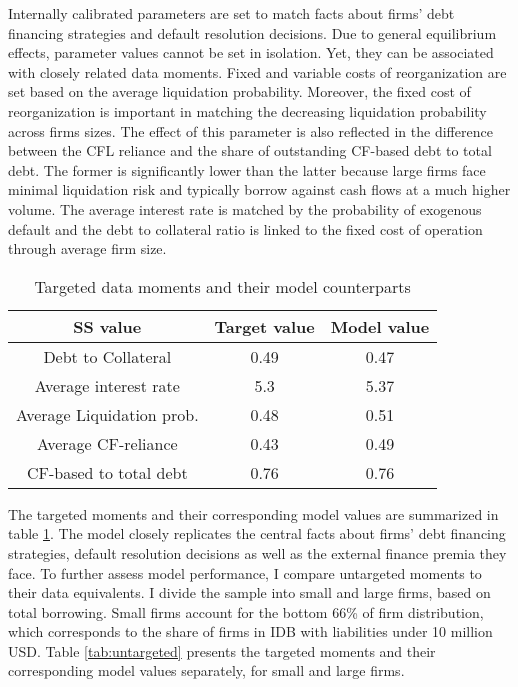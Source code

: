 \documentclass[12pt]{article}
\begin{document}
\noindent Internally calibrated parameters are set to match facts about firms' debt financing strategies and default resolution decisions. Due to general equilibrium effects, parameter values cannot be set in isolation. Yet, they can be associated with closely related data moments. Fixed and variable costs of reorganization are set based on the average liquidation probability. Moreover, the fixed cost of reorganization is important in matching the decreasing liquidation probability across firms sizes. The effect of this parameter is also reflected in the difference between the CFL reliance and the share of outstanding CF-based debt to total debt. The former is significantly lower than the latter because large firms face minimal liquidation risk and typically borrow against cash flows at a much higher volume. The average interest rate is matched by the probability of exogenous default and the debt to collateral ratio is linked to the fixed cost of operation through average firm size. 

\begin{table}[h!]
    \centering
    \begin{tabular}{c|c|c}
    \toprule
    \textbf{SS value} & \textbf{Target value} & \textbf{Model value} \\ 
    \midrule
    Debt to Collateral & 0.49 & 0.47 \\ 
    Average interest rate & 5.3 & 5.37 \\ 
    Average Liquidation prob. & 0.48 & 0.51 \\ 
    Average CF-reliance & 0.43 & 0.49 \\ 
   CF-based to total debt & 0.76 & 0.76 \\ 
    \bottomrule
    \end{tabular}
    \caption{Targeted data moments and their model counterparts}
    \label{tab:targets}
\end{table}

\noindent The targeted moments and their corresponding model values are summarized in table \ref{tab:targets}. The model closely replicates the central facts about firms' debt financing strategies, default resolution decisions as well as the external finance premia they face. To further assess model performance, I compare untargeted moments to their data equivalents. I divide the sample into small and large firms, based on total borrowing. Small firms account for the bottom 66\% of firm distribution, which corresponds to the share of firms in IDB with liabilities under 10 million USD. Table \ref{tab:untargeted} presents the targeted moments and their corresponding model values separately, for small and large firms.
\end{document}

